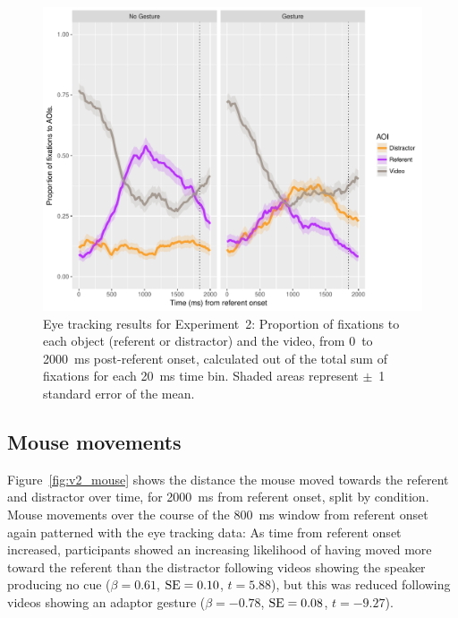 \documentclass[a4paper,man,natbib]{apa6}
\newcommand{\resultsLM}[3]{$\beta = #1$, $\textnormal{SE} = #2$, $t #3$}
\begin{document}
\begin{figure}[Ht]
  \centering
	\includegraphics[width=\linewidth]{./img/e8_fixations.pdf}
  \caption{Eye tracking results for Experiment~2: Proportion of fixations to each object (referent or distractor) and the video, from 0~to 2000~ms post-referent onset, calculated out of the total sum of fixations for each 20~ms time bin. Shaded areas represent $\pm$~1 standard error of the mean.}
  \label{fig:v2_eye}
\end{figure}

\subsection{Mouse movements}
Figure~\ref{fig:v2_mouse} shows the distance the mouse moved towards the referent and distractor over time, for 2000~ms from referent onset, split by condition.
Mouse movements over the course of the 800~ms window from referent onset again patterned with the eye tracking data:
As time from referent onset increased, participants showed an increasing likelihood of having moved more toward the referent than the distractor following videos showing the speaker producing no cue (\resultsLM{0.61}{0.10}{=5.88}), but this was reduced following videos showing an adaptor gesture (\resultsLM{-0.78}{0.08}{=-9.27}).
\end{document}
